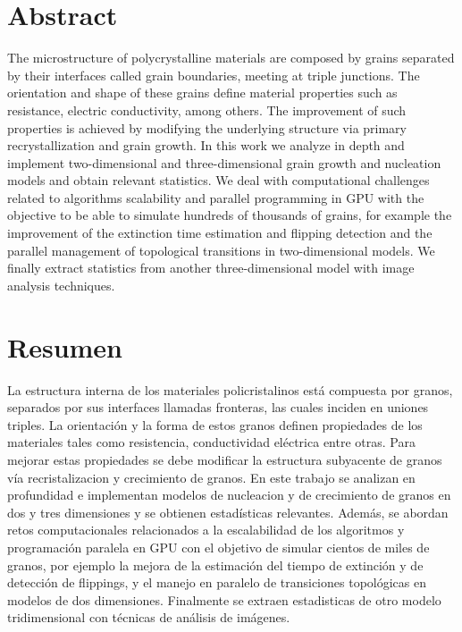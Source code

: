 \chapter{Abstract}

The microstructure of polycrystalline materials are composed by grains separated by their interfaces called grain boundaries, meeting at triple junctions. The orientation and shape of these grains define material properties such as resistance, electric conductivity, among others. The improvement of such properties is achieved by modifying the underlying structure via primary recrystallization and grain growth. In this work we analyze in depth and implement two-dimensional and three-dimensional grain growth and nucleation models and obtain relevant statistics. We deal with computational challenges related to algorithms scalability and parallel programming in GPU with the objective to be able to simulate hundreds of thousands of grains, for example the improvement of the extinction time estimation and flipping detection and the parallel management of topological transitions in two-dimensional models. We finally extract statistics from another three-dimensional model with image analysis techniques.

\chapter{Resumen}

La estructura interna de los materiales policristalinos está compuesta por granos, separados por sus interfaces llamadas fronteras, las cuales inciden en uniones triples. La orientación y la forma de estos granos definen propiedades de los materiales tales como resistencia, conductividad eléctrica entre otras. Para mejorar estas propiedades se debe modificar la estructura subyacente de granos vía recristalizacion y crecimiento de granos. En este trabajo se analizan en profundidad e implementan modelos de nucleacion y de crecimiento de granos en dos y tres dimensiones y se obtienen estadísticas relevantes. Además, se abordan retos computacionales relacionados a la escalabilidad de los algoritmos y programación paralela en GPU con el objetivo de simular cientos de miles de granos, por ejemplo la mejora de la estimación del tiempo de extinción y de detección de flippings, y el manejo en paralelo de transiciones topológicas en modelos de dos dimensiones. Finalmente se extraen estadisticas de otro modelo tridimensional con técnicas de análisis de imágenes.
